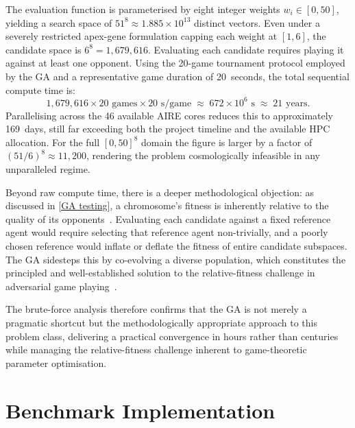 \begin{appendices}
The evaluation function is parameterised by eight integer weights $w_i \in [0, 50]$,
yielding a search space of $51^8 \approx 1.885 \times 10^{13}$ distinct vectors. Even
under a severely restricted apex-gene formulation capping each weight at $[1, 6]$,
the candidate space is $6^8 = 1{,}679{,}616$. Evaluating each candidate requires playing
it against at least one opponent. Using the 20-game tournament protocol employed by the
GA and a representative game duration of 20~seconds, the total sequential compute time is:
\[
  1{,}679{,}616 \times 20 \text{ games} \times 20 \text{ s/game}
  \;\approx\; 672 \times 10^6 \text{ s}
  \;\approx\; 21 \text{ years.}
\]
Parallelising across the 46 available AIRE cores reduces this to approximately 169~days,
still far exceeding both the project timeline and the available HPC allocation. For the
full $[0, 50]^8$ domain the figure is larger by a factor of $(51/6)^8 \approx 11{,}200$,
rendering the problem cosmologically infeasible in any unparalleled regime.

Beyond raw compute time, there is a deeper methodological objection: as discussed in
\cref{GA testing}, a chromosome's fitness is inherently relative to the quality of its
opponents~\cite{rosin1997new}. Evaluating each candidate against a fixed reference agent
would require selecting that reference agent non-trivially, and a poorly chosen reference
would inflate or deflate the fitness of entire candidate subspaces. The GA sidesteps this
by co-evolving a diverse population, which constitutes the principled and
well-established solution to the relative-fitness challenge in adversarial game
playing~\cite{ficici2000game}.

The brute-force analysis therefore confirms that the GA is not merely a pragmatic
shortcut but the methodologically appropriate approach to this problem class, delivering a
practical convergence in hours rather than centuries while managing the relative-fitness
challenge inherent to game-theoretic parameter optimisation.





\chapter{Benchmark Implementation}


\end{appendices}
